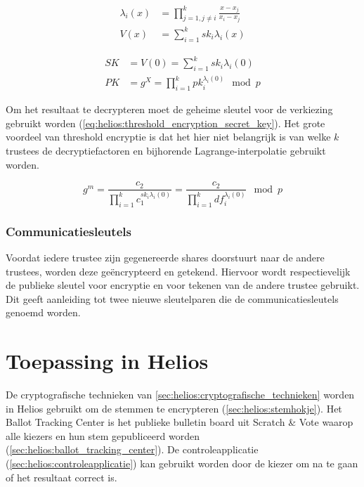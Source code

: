 \begin{align}
  \label{eq:helios:threshold_encryption_lagrange}
  \lambda_i(x) & = \prod_{j=1, j\not=i}^k{\frac{x - x_j}{x_i - x_j}} \\
  \label{eq:helios:threshold_encryption_polynomial}
  V(x) & = \sum_{i=1}^k{{sk}_i\lambda_i(x)}
\end{align}

\begin{align}
  \label{eq:helios:threshold_encryption_secret_key}
  SK & = V(0) = \sum_{i=1}^k{{sk}_i\lambda_i(0)} \\
  \label{eq:helios:threshold_encryption_public_key}
  PK & = g^{X} = \prod_{i=1}^k{{pk}_i^{\lambda_i(0)}} \mod{p}
\end{align}

\npar Om het resultaat te decrypteren moet de geheime sleutel voor de verkiezing gebruikt worden (\ref{eq:helios:threshold_encryption_secret_key}). Het grote voordeel van threshold encryptie is dat het hier niet belangrijk is van welke $k$ trustees de decryptiefactoren en bijhorende Lagrange-interpolatie gebruikt worden.

\begin{equation}
  \label{eq:helios:threshold_encryption_m}
  g^m = \frac{c_2}{\prod_{i=1}^k{c_1^{{sk}_i\lambda_i(0)}}} = \frac{c_2}{\prod_{i=1}^k{{df}_i^{\lambda_i(0)}}} \mod{p}
\end{equation}

\subsubsection{Communicatiesleutels}
\label{sec:helios:communicatiesleutels}

Voordat iedere trustee zijn gegenereerde shares doorstuurt naar de andere trustees, worden deze ge\"encrypteerd en getekend. Hiervoor wordt respectievelijk de publieke sleutel voor encryptie en voor tekenen van de andere trustee gebruikt. Dit geeft aanleiding tot twee nieuwe sleutelparen die de communicatiesleutels genoemd worden.

\section{Toepassing in Helios}

De cryptografische technieken van \ref{sec:helios:cryptografische_technieken} worden in Helios gebruikt om de stemmen te encrypteren (\ref{sec:helios:stemhokje}). Het Ballot Tracking Center is het publieke bulletin board uit Scratch \& Vote waarop alle kiezers en hun stem gepubliceerd worden (\ref{sec:helios:ballot_tracking_center}). De controleapplicatie (\ref{sec:helios:controleapplicatie}) kan gebruikt worden door de kiezer om na te gaan of het resultaat correct is.

